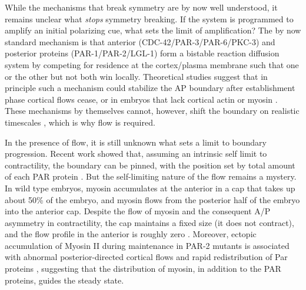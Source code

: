 \documentclass[11pt]{article}
\newcommand{\6}[1]{#1_{\text{6}}}
\newcommand{\3}[1]{#1_{\text{3}}}
\begin{document}
While the mechanisms that break symmetry are by now well understood, it remains unclear what \emph{stops} symmetry breaking. If the system is programmed to amplify an initial polarizing cue, what sets the limit of amplification? The by now standard mechanism is that anterior (CDC-42/PAR-3/PAR-6/PKC-3) and posterior proteins (PAR-1/PAR-2/LGL-1) form a bistable reaction diffusion system by competing for residence at the cortex/plasma membrane such that one or the other but not both win locally. Theoretical studies suggest that in principle such a mechanism could stabilize the AP boundary after establishment phase cortical flows cease, or in embryos that lack cortical actin or myosin \citep{mori2008wave, dawes20113, goehring2011polarization, lang2023oligomerization}. These mechanisms by themselves cannot, however, shift the boundary on realistic timescales \citep{lang2023oligomerization}, which is why flow is required.

In the presence of flow, it is still unknown what sets a limit to boundary progression. Recent work showed that, assuming an intrinsic self limit to contractility, the boundary can be pinned, with the position set by total amount of each PAR protein \citep{gross2019guiding, goehring2011polarization}. But the self-limiting nature of the flow remains a mystery. In wild type embryos, myosin accumulates at the anterior in a cap that takes up about 50\% of the embryo, and myosin flows from the posterior half of the embryo into the anterior cap. Despite the flow of myosin and the consequent A/P asymmetry in contractility, the cap maintains a fixed size (it does not contract), and the flow profile in the anterior is roughly zero \citep{sailer2015dynamic}. Moreover, ectopic accumulation of Myosin II during maintenance in PAR-2 mutants is associated with abnormal posterior-directed cortical flows and rapid redistribution of Par proteins \citep{munro2004cortical}, suggesting that the distribution of myosin, in addition to the PAR proteins, guides the steady state.
\end{document}
